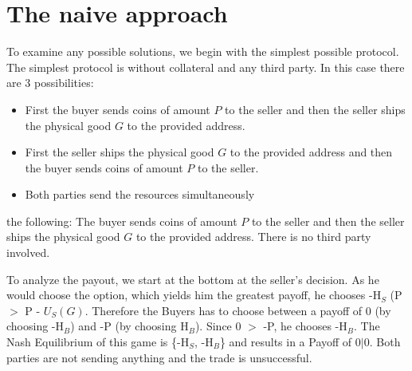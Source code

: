 \documentclass{cacthesis}
\begin{document}
\section{The naive approach}
To examine any possible solutions, we begin with the simplest possible protocol.\newline
The simplest protocol is without collateral and any third party. In this case there are 3 possibilities:
\begin{itemize}
	\item First the buyer sends coins of amount $P$ to the seller and then the seller ships the physical good $G$ to the provided address. 
	\item First the seller ships the physical good $G$ to the provided address and then the buyer sends coins of amount $P$ to the seller. 
	\item Both parties send the resources simultaneously
\end{itemize}
 the following: The buyer sends coins of amount $P$ to the seller and then the seller ships the physical good $G$ to the provided address. There is no third party involved. 

\newline
To analyze the payout, we start at the bottom at the seller's decision. As he would choose the option, which yields him the greatest payoff, he chooses -H$_S$ (P $>$ P - $U_S(G)$.\newline
Therefore the Buyers has to choose between a payoff of 0 (by choosing -H$_B$) and -P (by choosing H$_B$). Since 0 $>$ -P, he chooses -H$_B$.\newline
The Nash Equilibrium of this game is \{-H$_S$, -H$_B$\} and results in a Payoff of $0|0$. Both parties are not sending anything and the trade is unsuccessful.
\end{document}
